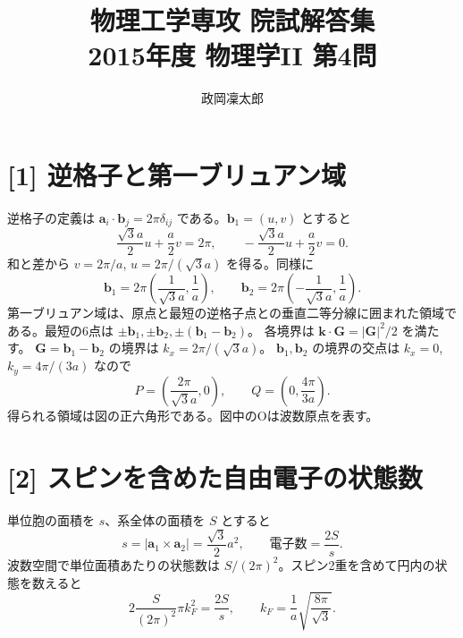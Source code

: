 \documentclass[11pt,a4paper]{article}
\title{物理工学専攻 院試解答集\\2015年度 物理学II 第4問}
\author{政岡凜太郎}
\date{}
\begin{document}
\maketitle

\section*{[1] 逆格子と第一ブリュアン域}
逆格子の定義は $\boldsymbol a_i\cdot\boldsymbol b_j=2\pi\delta_{ij}$ である。$\boldsymbol b_1=(u,v)$ とすると
\[
 \frac{\sqrt3a}{2}u+\frac a2v=2\pi,
 \qquad -\frac{\sqrt3a}{2}u+\frac a2v=0.
\]
和と差から $v=2\pi/a$, $u=2\pi/(\sqrt3a)$ を得る。同様に
\begin{equation}
 \boxed{\boldsymbol b_1=2\pi\left(\frac{1}{\sqrt3a},\frac1a\right),\qquad
 \boldsymbol b_2=2\pi\left(-\frac{1}{\sqrt3a},\frac1a\right).}
\end{equation}
第一ブリュアン域は、原点と最短の逆格子点との垂直二等分線に囲まれた領域である。最短の6点は
$\pm\boldsymbol b_1,\pm\boldsymbol b_2,\pm(\boldsymbol b_1-\boldsymbol b_2)$。
各境界は $\boldsymbol k\cdot\boldsymbol G=|\boldsymbol G|^2/2$ を満たす。
$\boldsymbol G=\boldsymbol b_1-\boldsymbol b_2$ の境界は $k_x=2\pi/(\sqrt3a)$。
$\boldsymbol b_1,\boldsymbol b_2$ の境界の交点は $k_x=0$, $k_y=4\pi/(3a)$ なので
\begin{equation}
 \boxed{P=\left(\frac{2\pi}{\sqrt3a},0\right),\qquad
 Q=\left(0,\frac{4\pi}{3a}\right).}
\end{equation}
得られる領域は図の正六角形である。図中のOは波数原点を表す。

\section*{[2] スピンを含めた自由電子の状態数}
単位胞の面積を $s$、系全体の面積を $S$ とすると
\[
 s=|\boldsymbol a_1\times\boldsymbol a_2|=\frac{\sqrt3}{2}a^2,
 \qquad \text{電子数}=\frac{2S}{s}.
\]
波数空間で単位面積あたりの状態数は $S/(2\pi)^2$。スピン2重を含めて円内の状態を数えると
\begin{equation}
 2\frac{S}{(2\pi)^2}\pi k_F^2=\frac{2S}{s},
 \qquad \boxed{k_F=\frac1a\sqrt{\frac{8\pi}{\sqrt3}}.}
\end{equation}
\end{document}
